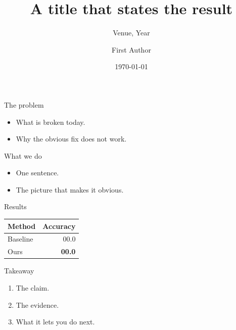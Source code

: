 \documentclass[aspectratio=169]{beamer}
\title{A title that states the result}
\subtitle{Venue, Year}
\author{First Author}
\institute{Affiliation}
\date{\today}
\begin{document}
\begin{frame}
  \titlepage
\end{frame}

\begin{frame}{The problem}
  \begin{itemize}
    \item What is broken today.
    \item Why the obvious fix does not work.
  \end{itemize}
\end{frame}

\begin{frame}{What we do}
  \begin{itemize}
    \item One sentence.
    \item The picture that makes it obvious.
  \end{itemize}
\end{frame}

\begin{frame}{Results}
  \begin{table}
    \centering
    \begin{tabular}{lr}
      \toprule
      Method & Accuracy \\
      \midrule
      Baseline & 00.0 \\
      Ours & \textbf{00.0} \\
      \bottomrule
    \end{tabular}
  \end{table}
\end{frame}

\begin{frame}{Takeaway}
  \begin{enumerate}
    \item The claim.
    \item The evidence.
    \item What it lets you do next.
  \end{enumerate}
\end{frame}
\end{document}
